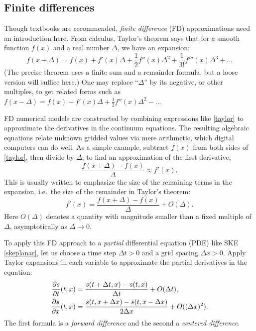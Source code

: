 \documentclass[letterpaper,final,12pt,reqno]{amsart}
\begin{document}
\subsection*{Finite differences}  Though textbooks \cite{LeVeque2007, MortonMayers2005} are recommended, \emph{finite difference} (FD) approximations need an introduction here.  From calculus, Taylor's theorem says that for a smooth function $f(x)$ and a real number $\Delta$, we have an expansion:
\begin{equation}
f(x+\Delta) = f(x) + f'(x) \Delta + \frac{1}{2} f''(x) \Delta^2 + \frac{1}{3!} f'''(x) \Delta^3 + \dots  \label{taylor}
\end{equation}
(The precise theorem uses a finite sum and a remainder formula, but a loose version will suffice here.)  One may replace ``$\Delta$'' by its negative, or other multiples, to get related forms such as $f(x-\Delta) = f(x) - f'(x) \Delta + \frac{1}{2} f''(x) \Delta^2 - \dots$ 

FD numerical models are constructed by combining expressions like \eqref{taylor} to approximate the derivatives in the continuum equations.  The resulting algebraic equations relate unknown gridded values via mere arithmetic, which digital computers can do well.  As a simple example, subtract $f(x)$ from both sides of \eqref{taylor}, then divide by $\Delta$, to find an approximation of the first derivative,
	$$\frac{f(x+\Delta) - f(x)}{\Delta} \approx f'(x).$$
This is usually written to emphasize the size of the remaining terms in the expansion, i.e.~the size of the remainder in Taylor's theorem:
	$$f'(x) = \frac{f(x+\Delta) - f(x)}{\Delta} + O(\Delta).$$
Here $O(\Delta)$ denotes a quantity with magnitude smaller than a fixed multiple of $\Delta$, asymptotically as $\Delta \to 0$.

To apply this FD approach to a \emph{partial} differential equation (PDE) like SKE \eqref{skeplanar}, let us choose a time step $\Delta t>0$ and a grid spacing $\Delta x>0$.  Apply Taylor expansions in each variable to approximate the partial derivatives in the equation:
\begin{align}
\frac{\partial s}{\partial t}(t,x) &= \frac{s(t+\Delta t,x) - s(t,x)}{\Delta t} + O(\Delta t), \label{fd:partials} \\
\frac{\partial s}{\partial x}(t,x) &= \frac{s(t,x+\Delta x) - s(t,x-\Delta x)}{2\Delta x} + O((\Delta x)^2). \notag
\end{align}
The first formula is a \emph{forward difference} and the second a \emph{centered difference}.
\end{document}
